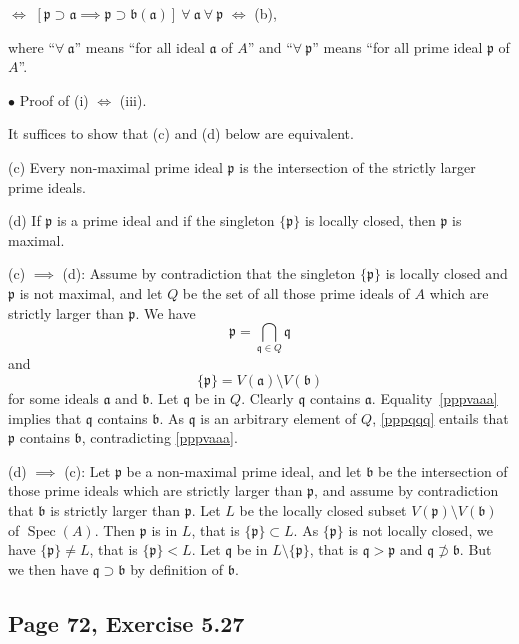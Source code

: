 \documentclass[parskip=half,fontsize=12pt]{scrartcl}%
\newcommand{\mf}{\mathfrak}
\newcommand{\aaa}{\mf a}
\newcommand{\bbb}{\mf b}
\newcommand{\ppp}{\mf p}
\newcommand{\qqq}{\mf q}
\newcommand{\bu}{\bullet}
\newcommand{\Spec}{\operatorname{Spec}}\newcommand{\Sp}{\operatorname{Spec}}
\begin{document}
\centerline{$\iff$ $[\ppp\supset\aaa\implies\ppp\supset\bbb(\aaa)]\ \forall\ \aaa\ \forall\ \ppp$ $\iff$ (b),}\medskip 

where ``$\forall\ \aaa$'' means ``for all ideal $\aaa$ of $A$'' and ``$\forall\ \ppp$'' means ``for all prime ideal $\ppp$ of $A$''.\medskip 

$\bu$ Proof of (i) $\iff$ (iii). 

It suffices to show that (c) and (d) below are equivalent.

(c) Every non-maximal prime ideal $\ppp$ is the intersection of the strictly larger prime ideals.

(d) If $\ppp$ is a prime ideal and if the singleton $\{\ppp\}$ is locally closed, then $\ppp$ is maximal.

(c) $\implies$ (d): Assume by contradiction that the singleton $\{\ppp\}$ is locally closed and $\ppp$ is not maximal, and let $Q$ be the set of all those prime ideals of $A$ which are strictly larger than $\ppp$. We have 
\begin{equation}\label{pppqqq}
\ppp=\bigcap_{\qqq\in Q}\qqq
\end{equation} 
and  
\begin{equation}\label{pppvaaa}
\{\ppp\}=V(\aaa)\setminus V(\bbb)
\end{equation} 
for some ideals $\aaa$ and $\bbb$. Let $\qqq$ be in $Q$. Clearly $\qqq$ contains $\aaa$. Equality~\eqref{pppvaaa} implies that $\qqq$ contains $\bbb$. As $\qqq$ is an arbitrary element of $Q$, \eqref{pppqqq} entails that $\ppp$ contains $\bbb$, contradicting \eqref{pppvaaa}.

(d) $\implies$ (c): Let $\ppp$ be a non-maximal prime ideal, and let $\bbb$ be the intersection of those prime ideals which are strictly larger than $\ppp$, and assume by contradiction that $\bbb$ is strictly larger than $\ppp$. Let $L$ be the locally closed subset $V(\ppp)\setminus V(\bbb)$ of $\Spec(A)$. Then $\ppp$ is in $L$, that is $\{\ppp\}\subset L$. As $\{\ppp\}$ is not locally closed, we have $\{\ppp\}\ne L$, that is $\{\ppp\}<L$. Let $\qqq$ be in $L\setminus\{\ppp\}$, that is $\qqq>\ppp$ and $\qqq\not\supset\bbb$. But we then have $\qqq\supset\bbb$ by definition of $\bbb$. 

\subsection{Page 72, Exercise 5.27}%
\end{document}

